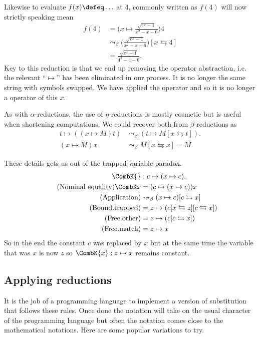 Likewise to evaluate $f(x)\defeq \ldots$ at $4$, commonly written as $f(4)$ will 
now strictly speaking mean
\begin{align*}
    f(4) & = \biggl(x\mapsto \frac{\sqrt{e^x-1}}{x^2-x-6}\biggr)4 \\
     & \leadsto_{\beta} \biggl(\frac{\sqrt{e^x-1}}{x^2-x-6}\biggr)[x\leftrightarrows 4]\\
    & =\frac{\sqrt{e^4-1}}{4^2-4-6}.
\end{align*}
Key to this reduction is that we end up removing the operator abstraction, i.e.
the relevant ``$\mapsto$'' has been eliminated in our process.  It is no longer
the same string with symbols swapped.  We have applied the operator and so it 
is no longer a operator of this $x$.

As with $\alpha$-reductions, the use of $\eta$-reductions is mostly cosmetic 
but is useful when shortening computations.  We could recover both from
$\beta$-reductions as 
\begin{align*}
    t\mapsto ((x\mapsto M)t) & \leadsto_{\beta} (t\mapsto M[x\leftrightarrows t]).\\
    (x\mapsto M)x & \leadsto_{\beta} M[x\leftrightarrows x]=M.
\end{align*}


These details
gets us out of the trapped variable paradox.
\begin{align*}
    \CombK{} &: c  \mapsto (x\mapsto c).\\
    \tag{Nominal equality}
    \CombK x & = (c\mapsto (x\mapsto c))x\\
    \tag{Application}
        & \leadsto_{\beta} (x\mapsto c)[c\leftrightarrows x]\\
    \tag{Bound.trapped}
        & = z\mapsto (c[x\leftrightarrows z][c\leftrightarrows x])\\
    \tag{Free.other}
        & = z\mapsto (c[c\leftrightarrows x])\\
    \tag{Free.match}
        & = z\mapsto x
\end{align*}
So in the end the constant $c$ was replaced by $x$ but at the same time 
the variable that was $x$ is now $z$ so $\CombK{x}:z\mapsto x$ remains constant.

\subsection{Applying reductions}

It is the job of a programming language to implement a version 
of substitution that follows these rules.  Once done the notation will take 
on the usual character of the programming language but often the notation 
comes close to the mathematical notations.  Here are some popular variations to try.
\begin{center}
    \hspace{1cm}
    \hspace{1cm}
    \\
    \hspace{1cm}
\end{center} 


